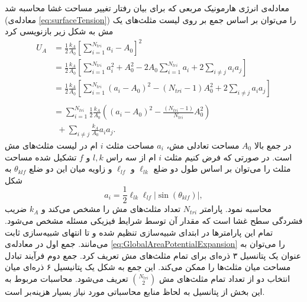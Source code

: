 معادله‌ی انرژی هارمونیک مربعی که برای بیان رفتار تغییر مساحت غشا محاسبه شد (معادله‌ی
\ref{eq:surfaceTension})
 را می‌توان بر اساس جمع بر روی لیست مثلث‌های یک مش به شکل زیر بازنویسی کرد
\begin{equation}
\begin{aligned}
U_{A}&=\frac{1}{2}\frac{k_A}{A_0}\left[\sum_{i=1}^{N_{tri}}a_i-A_0\right]^2\\
&=\frac{1}{2}\frac{k_A}{A_0}\left[\sum_{i=1}^{N_{tri}}a_i^2+A_0^2-2A_0\sum_{i=1}^{N_{tri}}a_i+2\sum_{i\neq j}a_ia_j\right]\\
&=\frac{1}{2}\frac{k_A}{A_0}\left[\sum_{i=1}^{N_{tri}}(a_i-A_0)^2-(N_{tri}-1)A_0^2+2\sum_{i\neq j}a_ia_j\right]\\
&\\
&=\sum_{i=1}^{N_{tri}}\frac{1}{2}\frac{k_A}{A_0}\left((a_i-A_0)^2-\frac{(N_{tri}-1)}{N_{tri}}A_0^2\right)\\
&~~+\sum_{i\neq j}\frac{k_A}{A_0}a_ia_j.
\label{eq:GlobalAreaPotentialExpansion}
\end{aligned}
\end{equation}
 در جمع بالا 
$A_0$
مساحت تعادلی مش،
$a_i$
مساحت مثلث
$i$
ام در لیست مثلث‌های مش است. در صورتی که فرض کنیم مثلث
$i$
ام از سه راس 
$l,k$
و
$f$
تشکیل شده مساحت مثلث را می‌توان بر اساس طول دو ضلع
$\ell_{lk}$
و
$\ell_{lf}$
 و زاویه‌ میان این دو ضلع
 $\theta_{klf}$
  به شکل 
 \begin{equation}
a_i=\frac{1}{2}\ell_{lk}\ell_{lf}|\sin(\theta_{klf})|,
\label{eq:singleTriangleArea}
\end{equation}
 محاسبه نمود. پارامتر 
 $N_{tri}$
تعداد مثلث‌های مش را مشخص می‌کند و 
$k_A$
ضریب فشردگی سطح غشا است که مقدار آن توسط شرایط فیزیکی مسئله مشخص می‌شود. تمام این پارامتر‌ها در ابتدای شبیه‌سازی تنظیم شده و تا انتهای شبیه‌سازی ثابت می‌مانند. جمع اول در معادله‌ی 
 \ref{eq:GlobalAreaPotentialExpansion}
 را می‌توان به عنوان یک پتانسیل ۳ ذره‌ای برای تمام مثلث‌های مش تعریف کرد. جمع دوم فرآیند تبادل مساحت میان مثلث‌ها را ممکن می‌کند. این جمع به شکل یک پتانیسیل ۶ ذره‌ای میان انتخاب دو از تعداد تمام مثلث‌های مش
 ${N_{tri} \choose 2}$
 تعریف می‌شود. محاسبات مربوط به این بخش از پتانسیل به لحاظ منابع محاسباتی مورد نیاز بسیار هزینه‌بر است.


